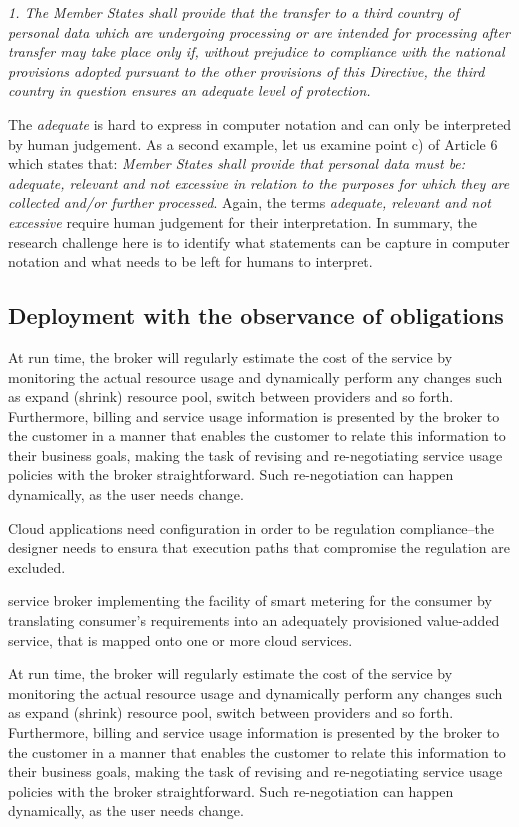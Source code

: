 \documentclass[runningheads,a4paper]{llncs}
\begin{document}
\emph{ 1. The Member States shall provide that the transfer to a third country of 
       personal data which are undergoing processing or are intended for processing 
       after transfer may take place only if, without prejudice to compliance with 
       the national provisions adopted pursuant to the other provisions of this 
       Directive, the third country in question ensures an adequate level of 
       protection.}

The \emph{adequate} is hard to express in computer notation and can only be
interpreted by human judgement. As a second example, let us examine 
point c) of Article 6 which states that:
\emph{Member States shall provide that personal data must be:
adequate, relevant and not excessive in relation to the purposes for 
which they are collected and/or further processed}. Again, 
the terms \emph{adequate, relevant and not excessive} require human
judgement for their interpretation.
In summary, the research challenge here is to identify what statements can
be capture in computer notation and what needs to be left for humans to
interpret.

\subsection{Deployment with the observance of obligations}
At run time, the broker will regularly estimate the cost of the service by
monitoring the actual resource usage and dynamically perform any changes such as expand (shrink)
resource pool, switch between providers and so forth. Furthermore, billing and service usage information is
presented by the broker to the customer in a manner that enables the customer to relate this information to
their business goals, making the task of revising and re-negotiating service usage policies with the broker
straightforward. Such re-negotiation can happen dynamically, as the user needs change.

Cloud applications need configuration in order to be regulation
compliance--the designer needs to ensura that execution paths
that compromise the regulation are excluded.

service broker implementing the facility of smart metering for the consumer by
translating consumer’s requirements into an adequately provisioned value-added service, that is mapped
onto one or more cloud services. 

At run time, the broker will regularly estimate the cost of the service by
monitoring the actual resource usage and dynamically perform any changes such as expand (shrink)
resource pool, switch between providers and so forth. Furthermore, billing and service usage information is
presented by the broker to the customer in a manner that enables the customer to relate this information to
their business goals, making the task of revising and re-negotiating service usage policies with the broker
straightforward. Such re-negotiation can happen dynamically, as the user needs change.
\end{document}
